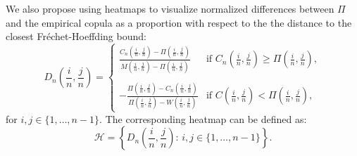\documentclass[journal]{vgtc}                %
\begin{document}
We also propose using heatmaps to visualize normalized differences between $\Pi$ and the empirical copula as a proportion with respect to the the distance to the closest Fr\'echet-Hoeffding bound:   
\[
    D_{n}\left(\frac{i}{n},\frac{j}{n}\right) = 
\left\{
\begin{array}{ll}
  \displaystyle \frac{C_{n}(\frac{i}{n},\frac{j}{n})-\Pi(\frac{i}{n},\frac{j}{n})}{M(\frac{i}{n},\frac{j}{n})-\Pi(\frac{i}{n},\frac{j}{n})} & \text{if  } C_{n}(\frac{i}{n},\frac{j}{n}) \geq \Pi(\frac{i}{n},\frac{j}{n}), \\[10pt]
  { } \\ 
  \displaystyle -\frac{\Pi(\frac{i}{n},\frac{j}{n})-C_n(\frac{i}{n},\frac{j}{n})}{\Pi(\frac{i}{n},\frac{j}{n})-W(\frac{i}{n},\frac{j}{n})} & \text{if  } C(\frac{i}{n},\frac{j}{n}) < \Pi(\frac{i}{n},\frac{j}{n}),
\end{array}  
\right.
\]
for $i,j\in\{1,\ldots,n-1\}.$ The corresponding heatmap can be defined as:
\begin{equation}\label{eq:Dn}
    \mathcal{H} = \left\{ D_{n}(\frac{i}{n},\frac{j}{n}):\,i,j\in\{1,\ldots,n-1\} \right\}.
\end{equation}
\end{document}
